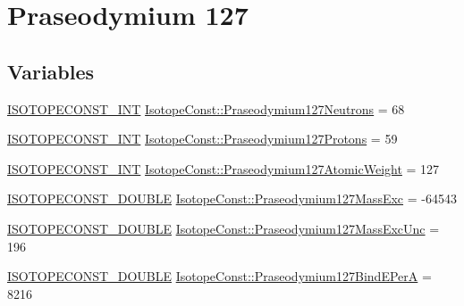 \hypertarget{group___isotope_const-_praseodymium-_pr127}{}\section{Praseodymium 127}
\label{group___isotope_const-_praseodymium-_pr127}
\subsection*{Variables}
\begin{DoxyCompactItemize}
\item 
\mbox{\hyperlink{group___isotope_const-_macros_ga5f18360b3e99483a35c32d789e62621c}{I\+S\+O\+T\+O\+P\+E\+C\+O\+N\+S\+T\+\_\+\+I\+NT}} \mbox{\hyperlink{group___isotope_const-_praseodymium-_pr127_gaa52cc8b89d63920e46ced1e99b910a89}{Isotope\+Const\+::\+Praseodymium127\+Neutrons}} = 68
\item 
\mbox{\hyperlink{group___isotope_const-_macros_ga5f18360b3e99483a35c32d789e62621c}{I\+S\+O\+T\+O\+P\+E\+C\+O\+N\+S\+T\+\_\+\+I\+NT}} \mbox{\hyperlink{group___isotope_const-_praseodymium-_pr127_ga803cd454c1952420a778909727a72097}{Isotope\+Const\+::\+Praseodymium127\+Protons}} = 59
\item 
\mbox{\hyperlink{group___isotope_const-_macros_ga5f18360b3e99483a35c32d789e62621c}{I\+S\+O\+T\+O\+P\+E\+C\+O\+N\+S\+T\+\_\+\+I\+NT}} \mbox{\hyperlink{group___isotope_const-_praseodymium-_pr127_ga9655a2abd0e82080f4dfef348f86fd4d}{Isotope\+Const\+::\+Praseodymium127\+Atomic\+Weight}} = 127
\item 
\mbox{\hyperlink{group___isotope_const-_macros_ga8f45a7272ce02c0b4c65c44636ed719a}{I\+S\+O\+T\+O\+P\+E\+C\+O\+N\+S\+T\+\_\+\+D\+O\+U\+B\+LE}} \mbox{\hyperlink{group___isotope_const-_praseodymium-_pr127_gaae4ebf5cb725b12d731b230e021e9f6f}{Isotope\+Const\+::\+Praseodymium127\+Mass\+Exc}} = -\/64543
\item 
\mbox{\hyperlink{group___isotope_const-_macros_ga8f45a7272ce02c0b4c65c44636ed719a}{I\+S\+O\+T\+O\+P\+E\+C\+O\+N\+S\+T\+\_\+\+D\+O\+U\+B\+LE}} \mbox{\hyperlink{group___isotope_const-_praseodymium-_pr127_gac053202ad09dcb02b367a3f9c264f5ff}{Isotope\+Const\+::\+Praseodymium127\+Mass\+Exc\+Unc}} = 196
\item 
\mbox{\hyperlink{group___isotope_const-_macros_ga8f45a7272ce02c0b4c65c44636ed719a}{I\+S\+O\+T\+O\+P\+E\+C\+O\+N\+S\+T\+\_\+\+D\+O\+U\+B\+LE}} \mbox{\hyperlink{group___isotope_const-_praseodymium-_pr127_ga3794d5e0d1e4d788529eabf95015e49f}{Isotope\+Const\+::\+Praseodymium127\+Bind\+E\+PerA}} = 8216

\end{DoxyCompactItemize}
